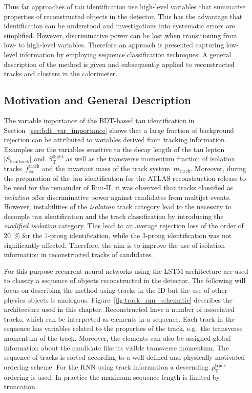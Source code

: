 Thus far approaches of tau identification use high-level variables that
summarise properties of reconstructed objects in the detector. This has the
advantage that identification can be understood and investigations into
systematic errors are simplified. However, discriminative power can be lost when
transitioning from low- to high-level variables. Therefore an approach is
presented capturing low-level information by employing sequence classification
techniques. A general description of the method is given and subsequently
applied to reconstructed tracks and clusters in the calorimeter.

\subsection{Motivation and General Description}
\label{sec:rnn_descr}

The variable importance of the BDT-based tau identification in
Section~\ref{sec:bdt_var_importance} shows that a large fraction of background
rejection can be attributed to variables derived from tracking information.
Examples are the variables sensitive to the decay length of the tau
lepton~$|S_\text{leadtrack}|$ and~$S_\text{T}^\text{flight}$ as well as the
transverse momentum fraction of isolation tracks~$f_\text{iso}^\text{track}$ and
the invariant mass of the track system~$m_\text{track}$. Moreover, during the
preparation of the tau identification for the ATLAS reconstruction release to be
used for the remainder of Run-II, it was observed that tracks classified as
\emph{isolation} offer discriminative power against \tauhadvis candidates from
multijet events. However, instabilities of the \emph{isolation} track category
lead to the necessity to decouple tau identification and the track
classification by introducing the \emph{modified isolation} category. This lead
to an average rejection loss of the order of \SI{20}{\percent} for the 1-prong
identification, while the 3-prong identification was not significantly affected.
Therefore, the aim is to improve the use of isolation information in
reconstructed tracks of \tauhadvis candidates.

For this purpose recurrent neural networks using the LSTM architecture are used
to classify a sequence of objects reconstructed in the detector. The following
will focus on describing the method using tracks in the ID but the use of other
physics objects is analogous. Figure~\ref{fig:track_rnn_schematic} describes the
architecture used in this chapter. Reconstructed \tauhadvis have a number of
associated tracks, which can be interpreted as elements in a sequence. Each
track in the sequence has variables related to the properties of the track,
e.g.\ the transverse momentum of the track. Moreover, the elements can also be
assigned global information about the \tauhadvis candidate like its visible
transverse momentum. The sequence of tracks is sorted according to a
well-defined and physically motivated ordering scheme. For the RNN using track
information a descending~$p_\text{T}^\text{track}$ ordering is used. In practice
the maximum sequence length is limited by truncation.

